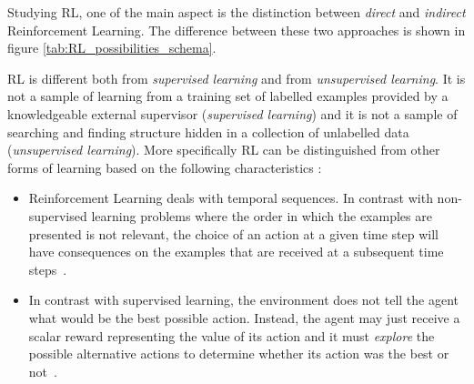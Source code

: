 Studying RL, one of the main aspect is the distinction between \textit{direct} and \textit{indirect} Reinforcement Learning. The difference between these two approaches is shown in figure \ref{tab:RL_possibilities_schema}. \\

\begin{table}[h!]
	\caption{RL's approaches classification.}
	\label{tab:RL_possibilities_schema}
\end{table}

RL is different both from \textit{supervised learning} and from \textit{unsupervised learning}. It is not a sample of learning from a training set of labelled examples provided by a knowledgeable external supervisor (\textit{supervised learning}) and it is not a sample of searching and finding structure hidden in a collection of unlabelled data (\textit{unsupervised learning}). More specifically RL can be distinguished from other forms of learning based on the following characteristics :

\begin{itemize}
	\item Reinforcement Learning deals with temporal sequences. In contrast with non-supervised learning problems where the order in which the examples are presented is not relevant, the choice of an action at a given time step will have consequences on the examples that are received at a subsequent time steps~\cite{Sigaud:2010:MDP:1841781}.
	\item In contrast with supervised learning, the environment does not tell the agent what would be the best possible action. Instead, the agent may just receive a scalar reward representing the value of its action and it must \textit{explore} the possible alternative actions to determine whether its action was the best or not~\cite{Sigaud:2010:MDP:1841781}.
\end{itemize}

